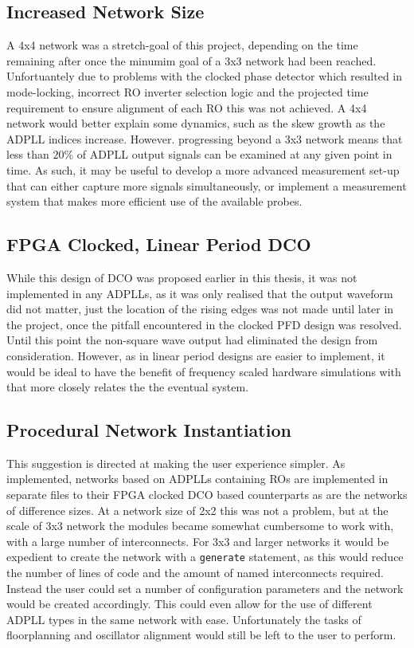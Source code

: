 \subsection{Increased Network Size}
A 4x4 network was a stretch-goal of this project, depending on the time remaining after once the minumim goal of a 3x3 network had been reached. Unfortuantely due to problems with the clocked phase detector which resulted in mode-locking, incorrect \ac{RO} inverter selection logic and the projected time requirement to ensure alignment of each \ac{RO} this was not achieved. A 4x4 network would better explain some dynamics, such as the skew growth as the \ac{ADPLL} indices increase. However. progressing beyond a 3x3 network means that less than $20\%$ of \ac{ADPLL} output signals can be examined at any given point in time. As such, it may be useful to develop a more advanced measurement set-up that can either capture more signals simultaneously, or implement a measurement system that makes more efficient use of the available probes.

\subsection{\acs{FPGA} Clocked, Linear Period \acs{DCO}}
While this design of \ac{DCO} was proposed earlier in this thesis, it was not implemented in any \ac{ADPLL}s, as it was only realised that the output waveform did not matter, just the location of the rising edges was not made until later in the project, once the pitfall encountered in the clocked \ac{PFD} design was resolved. Until this point the non-square wave output had eliminated the design from consideration. However, as in  linear period designs are easier to implement, it would be ideal to have the benefit of frequency scaled hardware simulations with  that more closely relates the the eventual system.

\subsection{Procedural Network Instantiation}
This suggestion is directed at making the user experience simpler. As implemented, networks based on \ac{ADPLL}s containing \ac{RO}s are implemented in separate files to their \ac{FPGA} clocked \ac{DCO} based counterparts as are the networks of difference sizes. At a network size of 2x2 this was not a problem, but at the scale of 3x3 network the modules became somewhat cumbersome to work with, with a large number of interconnects. For 3x3 and larger networks it would be expedient to create the network with a \texttt{generate} statement, as this would reduce the number of lines of code and the amount of named interconnects required. Instead the user could set a number of configuration parameters and the network would be created accordingly. This could even allow for the use of different \ac{ADPLL} types in the same network with ease. Unfortunately the tasks of floorplanning and oscillator alignment would still be left to the user to perform.


